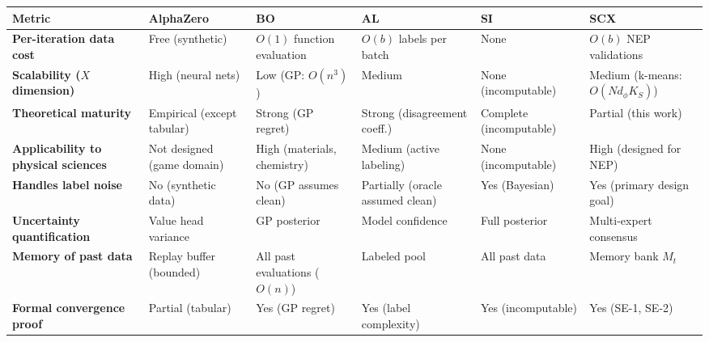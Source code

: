 \documentclass[
  12pt,
]{ctexart}
\begin{document}
\begin{longtable}[]{@{}
  >{\raggedright\arraybackslash}p{}
  >{\raggedright\arraybackslash}p{}
  >{\raggedright\arraybackslash}p{}
  >{\raggedright\arraybackslash}p{}
  >{\raggedright\arraybackslash}p{}
  >{\raggedright\arraybackslash}p{}@{}}
\toprule\noalign{}
\begin{minipage}[b]{\linewidth}\raggedright
Metric
\end{minipage} & \begin{minipage}[b]{\linewidth}\raggedright
AlphaZero
\end{minipage} & \begin{minipage}[b]{\linewidth}\raggedright
BO
\end{minipage} & \begin{minipage}[b]{\linewidth}\raggedright
AL
\end{minipage} & \begin{minipage}[b]{\linewidth}\raggedright
SI
\end{minipage} & \begin{minipage}[b]{\linewidth}\raggedright
SCX
\end{minipage} \\
\midrule\noalign{}
\endhead
\bottomrule\noalign{}
\endlastfoot
\textbf{Per-iteration data cost} & Free (synthetic) & \(O(1)\) function
evaluation & \(O(b)\) labels per batch & None & \(O(b)\) NEP
validations \\
\textbf{Scalability (\(X\) dimension)} & High (neural nets) & Low (GP:
\(O(n^3)\)) & Medium & None (incomputable) & Medium (k-means:
\(O(N d_\phi K_S)\)) \\
\textbf{Theoretical maturity} & Empirical (except tabular) & Strong (GP
regret) & Strong (disagreement coeff.) & Complete (incomputable) &
Partial (this work) \\
\textbf{Applicability to physical sciences} & Not designed (game domain)
& High (materials, chemistry) & Medium (active labeling) & None
(incomputable) & High (designed for NEP) \\
\textbf{Handles label noise} & No (synthetic data) & No (GP assumes
clean) & Partially (oracle assumed clean) & Yes (Bayesian) & Yes
(primary design goal) \\
\textbf{Uncertainty quantification} & Value head variance & GP posterior
& Model confidence & Full posterior & Multi-expert consensus \\
\textbf{Memory of past data} & Replay buffer (bounded) & All past
evaluations (\(O(n)\)) & Labeled pool & All past data & Memory bank
\(M_t\) \\
\textbf{Formal convergence proof} & Partial (tabular) & Yes (GP regret)
& Yes (label complexity) & Yes (incomputable) & Yes (SE-1, SE-2) \\
\end{longtable}
\end{document}
